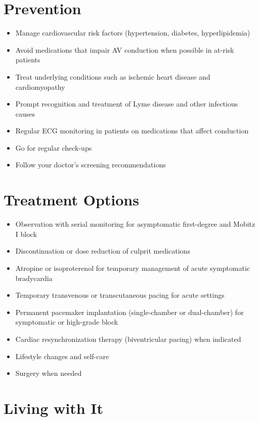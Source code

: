 \section{Prevention}

\begin{itemize}[noitemsep]
  \item Manage cardiovascular risk factors (hypertension, diabetes, hyperlipidemia)
  \item Avoid medications that impair AV conduction when possible in at-risk patients
  \item Treat underlying conditions such as ischemic heart disease and cardiomyopathy
  \item Prompt recognition and treatment of Lyme disease and other infectious causes
  \item Regular ECG monitoring in patients on medications that affect conduction
  \item Go for regular check-ups
  \item Follow your doctor's screening recommendations
\end{itemize}

\section{Treatment Options}

\begin{itemize}[noitemsep]
  \item Observation with serial monitoring for asymptomatic first-degree and Mobitz I block
  \item Discontinuation or dose reduction of culprit medications
  \item Atropine or isoproterenol for temporary management of acute symptomatic bradycardia
  \item Temporary transvenous or transcutaneous pacing for acute settings
  \item Permanent pacemaker implantation (single-chamber or dual-chamber) for symptomatic or high-grade block
  \item Cardiac resynchronization therapy (biventricular pacing) when indicated
  \item Lifestyle changes and self-care
  \item Surgery when needed
\end{itemize}

\section{Living with It}

